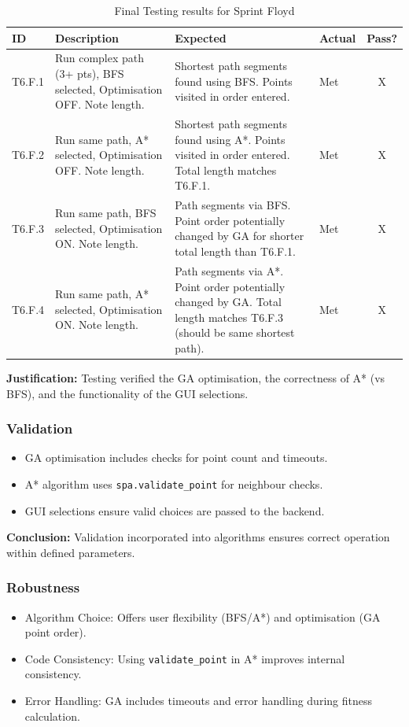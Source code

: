 \begin{table}[htbp] %
	\centering
	\begin{tabularx}{\textwidth}{|l|X|p{5.5cm}|p{2.5cm}|c|}
		\hline
		\textbf{ID} & \textbf{Description} & \textbf{Expected} & \textbf{Actual} & \textbf{Pass?} \\
		\hline
		T6.F.1 & Run complex path (3+ pts), BFS selected, Optimisation OFF. Note length. & Shortest path segments found using BFS. Points visited in order entered. & Met & X \\
		\hline
		T6.F.2 & Run same path, A* selected, Optimisation OFF. Note length. & Shortest path segments found using A*. Points visited in order entered. Total length matches T6.F.1. & Met & X \\
		\hline
		T6.F.3 & Run same path, BFS selected, Optimisation ON. Note length. & Path segments via BFS. Point order potentially changed by GA for shorter total length than T6.F.1. & Met & X \\
		\hline
		T6.F.4 & Run same path, A* selected, Optimisation ON. Note length. & Path segments via A*. Point order potentially changed by GA. Total length matches T6.F.3 (should be same shortest path). & Met & X \\
		\hline
	\end{tabularx}
	\caption{Final Testing results for Sprint Floyd}
\end{table}

\textbf{Justification:} Testing verified the GA optimisation, the correctness of A* (vs BFS), and the functionality of the GUI selections.

\subsubsection{Validation}
\begin{itemize}
	\item GA optimisation includes checks for point count and timeouts.
	\item A* algorithm uses \verb|spa.validate_point| for neighbour checks.
	\item GUI selections ensure valid choices are passed to the backend.
\end{itemize}
\textbf{Conclusion:} Validation incorporated into algorithms ensures correct operation within defined parameters.

\subsubsection{Robustness}
\begin{itemize}
	\item Algorithm Choice: Offers user flexibility (BFS/A*) and optimisation (GA point order).
	\item Code Consistency: Using \verb|validate_point| in A* improves internal consistency.
	\item Error Handling: GA includes timeouts and error handling during fitness calculation.
\end{itemize}


